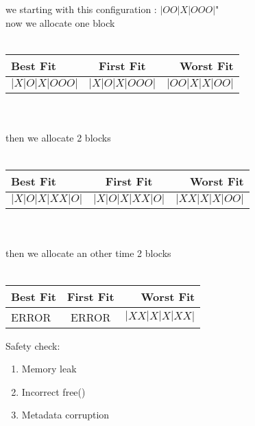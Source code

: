 \documentclass{article}
\begin{document}
\begin{itemize}
we starting with this configuration :
$|OO|X|OOO|$"\\
now we allocate one block\\\\
\begin{tabular}{|l|c|r|}
   \hline 
   Best Fit & First Fit & Worst Fit \\
   \hline
   $|X|O|X|OOO|$ & $|X|O|X|OOO|$ & $|OO|X|X|OO|$ \\
   \hline
\end{tabular}
\\
\\then we allocate 2 blocks\\\\
\begin{tabular}{|l|c|r|}
   \hline 
   Best Fit & First Fit & Worst Fit \\
   \hline
   $|X|O|X|XX|O|$ & $|X|O|X|XX|O|$ & $|XX|X|X|OO|$ \\
   \hline
\end{tabular}
\\
\\then we allocate an other time 2 blocks\\\\
\begin{tabular}{|l|c|r|}
   \hline 
   Best Fit & First Fit & Worst Fit \\
   \hline
   ERROR & ERROR & $|XX|X|X|XX|$ \\
   \hline
\end{tabular}


\end{itemize}

\begin{flushleft}
Safety check:

\begin{enumerate}
\item Memory leak

\item Incorrect free()

\item Metadata corruption



\end{enumerate}


\end{flushleft}
\end{document}

